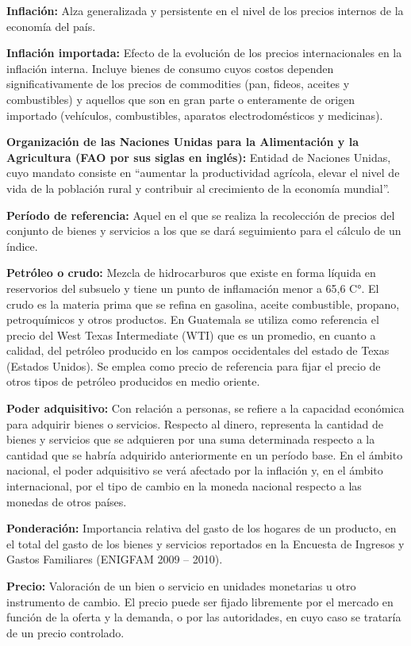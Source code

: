 {\textbf{Inflación:} Alza generalizada y persistente en el nivel de los precios internos de la economía del país.

\textbf{Inflación importada:} Efecto de la evolución de los precios internacionales en la inflación interna. Incluye bienes de consumo cuyos costos dependen significativamente de los precios de commodities (pan, fideos, aceites y combustibles) y aquellos que son en gran parte o enteramente de origen importado (vehículos, combustibles, aparatos electrodomésticos y medicinas).

\textbf{Organización de las Naciones Unidas para la Alimentación y la Agricultura (FAO por sus siglas en inglés):} Entidad de Naciones Unidas, cuyo mandato consiste en “aumentar la productividad agrícola, elevar el nivel de vida de la población rural y contribuir al crecimiento de la economía mundial”.

\textbf{Período de referencia:} Aquel en el que se realiza la recolección de precios del conjunto de bienes y servicios a los que se dará seguimiento para el cálculo de un índice.

\textbf{Petróleo o crudo:} Mezcla de hidrocarburos que existe en forma líquida en reservorios del subsuelo y tiene un punto de inflamación menor a 65,6 C°. El crudo es la materia prima que se refina en gasolina, aceite combustible, propano, petroquímicos y otros productos. En Guatemala se utiliza como referencia el precio del West Texas Intermediate (WTI) que es un promedio, en cuanto a calidad, del petróleo producido en los campos occidentales del estado de Texas (Estados Unidos). Se emplea como precio de referencia para fijar el precio de otros tipos de petróleo producidos en medio oriente.

\textbf{Poder adquisitivo:} Con relación a personas, se refiere a la capacidad económica para adquirir bienes o servicios. Respecto al dinero, representa la cantidad de bienes y servicios que se adquieren por una suma determinada respecto a la cantidad que se habría adquirido anteriormente en un período base. En el ámbito nacional, el poder adquisitivo se verá afectado por la inflación y, en el ámbito internacional, por el tipo de cambio en la moneda nacional respecto a las monedas de otros países.

\textbf{Ponderación:} Importancia relativa del gasto de los hogares de un producto, en el total del gasto de los bienes y servicios reportados en la Encuesta de Ingresos y Gastos Familiares (ENIGFAM 2009 – 2010).

\textbf{Precio:} Valoración de un bien o servicio en unidades monetarias u otro instrumento de cambio. El precio puede ser fijado libremente por el mercado en función de la oferta y la demanda, o por las autoridades, en cuyo caso se trataría de un precio controlado.

}

